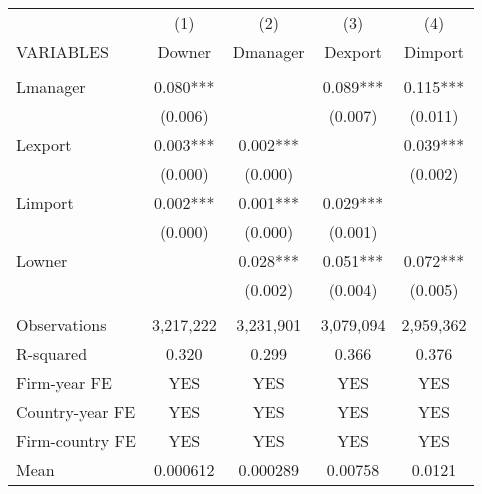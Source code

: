 \begin{tabular}{lcccc} \hline
 & (1) & (2) & (3) & (4) \\
VARIABLES & Downer & Dmanager & Dexport & Dimport \\ \hline
 &  &  &  &  \\
Lmanager & 0.080*** &  & 0.089*** & 0.115*** \\
 & (0.006) &  & (0.007) & (0.011) \\
Lexport & 0.003*** & 0.002*** &  & 0.039*** \\
 & (0.000) & (0.000) &  & (0.002) \\
Limport & 0.002*** & 0.001*** & 0.029*** &  \\
 & (0.000) & (0.000) & (0.001) &  \\
Lowner &  & 0.028*** & 0.051*** & 0.072*** \\
 &  & (0.002) & (0.004) & (0.005) \\
 &  &  &  &  \\
Observations & 3,217,222 & 3,231,901 & 3,079,094 & 2,959,362 \\
R-squared & 0.320 & 0.299 & 0.366 & 0.376 \\
Firm-year FE & YES & YES & YES & YES \\
Country-year FE & YES & YES & YES & YES \\
Firm-country FE & YES & YES & YES & YES \\
 Mean & 0.000612 & 0.000289 & 0.00758 & 0.0121 \\ \hline
\end{tabular}
